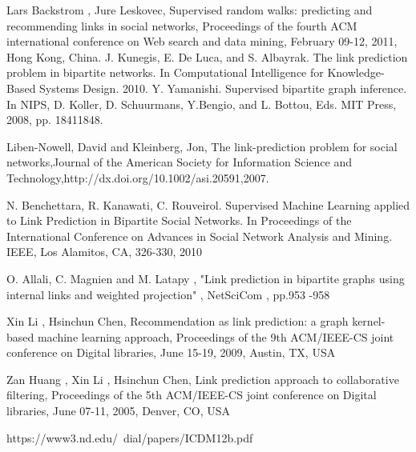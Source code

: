 \documentclass[letterpaper,twocolumn,11pt]{article}
\begin{document}

\begin{thebibliography}{100}
	 Lars Backstrom , Jure Leskovec, Supervised random walks: predicting and recommending links in social networks, Proceedings of the fourth ACM international conference on Web search and data mining, February 09-12, 2011, Hong Kong, China.   
     J. Kunegis, E. De Luca, and S. Albayrak. The link prediction problem in bipartite networks. In Computational Intelligence for Knowledge-Based Systems Design. 2010.
	 Y. Yamanishi. Supervised bipartite graph inference. In NIPS, D. Koller, D. Schuurmans, Y.Bengio, and L. Bottou, Eds. MIT Press, 2008, pp. 18411848.
    
     Liben-Nowell, David and Kleinberg, Jon, The link-prediction problem for social networks,Journal of the American Society for Information Science and Technology,http://dx.doi.org/10.1002/asi.20591,2007.

     N. Benchettara, R. Kanawati, C. Rouveirol. Supervised Machine Learning applied to Link Prediction in Bipartite Social Networks. In Proceedings of the International Conference on Advances in Social Network Analysis and Mining. IEEE, Los Alamitos, CA, 326-330, 2010
    
    O. Allali, C. Magnien and M. Latapy , "Link prediction in bipartite graphs using internal links and weighted projection" ,  NetSciCom , pp.953 -958 
   
    Xin Li , Hsinchun Chen, Recommendation as link prediction: a graph kernel-based machine learning approach, Proceedings of the 9th ACM/IEEE-CS joint conference on Digital libraries, June 15-19, 2009, Austin, TX, USA
   
    Zan Huang , Xin Li , Hsinchun Chen, Link prediction approach to collaborative filtering, Proceedings of the 5th ACM/IEEE-CS joint conference on Digital libraries, June 07-11, 2005, Denver, CO, USA 
    
     https://www3.nd.edu/~dial/papers/ICDM12b.pdf
    
\end{thebibliography}


%
%
%
%
%
\end{document}
